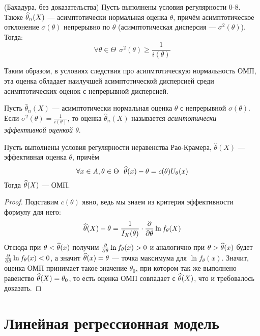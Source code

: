 \begin{theorem} (Бахадура, без доказательства)
	Пусть выполнены условия регулярности 0-8. Также $\widehat{\theta}_n(X)$ --- асимптотически нормальная оценка $\theta$, причём асимптотическое отклонение $\sigma(\theta)$ непрерывно по $\theta$ (асимптотическая дисперсия --- $\sigma^2(\theta)$). Тогда:
	\[
		\forall \theta \in \Theta\ \ \sigma^2(\theta) \ge \frac{1}{i(\theta)}
	\]
\end{theorem}

\begin{note}
	Таким образом, в условиях следствия про асипмтотическую нормальность ОМП, эта оценка обладает наилучшей асимптотической дисперсией среди асимптотических оценок с непрерывной дисперсией.
\end{note}

\begin{definition}
	Пусть $\hat{\theta}_n(X)$ --- асимптотически нормальная оценка $\theta$ с непрерывной $\sigma(\theta)$. Если $\sigma^2(\theta) = \frac{1}{i(\theta)}$, то оценка $\hat{\theta}_n(X)$ называется \textit{асимтотически эффективной оценкой $\theta$}.
\end{definition}

\begin{proposition}
	Пусть выполнены условия регулярности неравенства Рао-Крамера, $\hat{\theta}(X)$ --- эффективная оценка $\theta$, причём
	\[
		\forall x \in A, \theta \in \Theta\ \ \wh{\theta}(x) - \theta = c(\theta) U_\theta(x)
	\]
	Тогда $\widehat{\theta}(X)$ --- ОМП.
\end{proposition}

\begin{proof}
	Подставим $c(\theta)$ явно, ведь мы знаем из критерия эффективности формулу для него:
	\[
		\widehat{\theta}(X) - \theta = \frac{1}{I_X(\theta)} \cdot \frac{\partial }{\partial \theta} \ln f_\theta(X)
	\]
	Отсюда при $\theta < \widehat{\theta}(x)$ получим $\frac{\partial }{\partial \theta} \ln f_\theta(x) > 0$ и аналогично при $\theta > \widehat{\theta}(x)$ будет $\frac{\partial }{\partial \theta} \ln f_\theta(x) < 0$, а значит $\widehat{\theta}(x) = \theta$ --- точка максимума для $\ln f_\theta(x)$. Значит, оценка ОМП принимает такое значение $\theta_0$, при котором так же выполнено равенство $\widehat{\theta}(X) = \theta_0$, то есть оценка ОМП совпадает с $\widehat{\theta}(X)$, что и требовалось доказать.
\end{proof}

\section{Линейная регрессионная модель}

